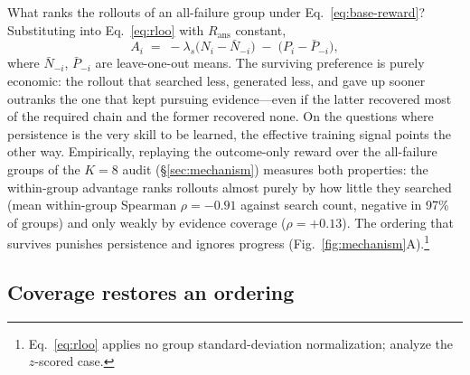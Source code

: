 What ranks the rollouts of an all-failure group under
Eq.~\ref{eq:base-reward}? Substituting into Eq.~\ref{eq:rloo} with
$R_{\mathrm{ans}}$ constant,
\begin{equation}
A_i \;=\; -\lambda_{s}\bigl(N_i - \bar{N}_{-i}\bigr)
\;-\;\bigl(P_i - \bar{P}_{-i}\bigr),
\label{eq:cost-ordering}
\end{equation}
where $\bar{N}_{-i}$, $\bar{P}_{-i}$ are leave-one-out means. The
surviving preference is purely economic: the rollout that searched
less, generated less, and gave up sooner outranks the one that kept
pursuing evidence---even if the latter recovered most of the required
chain and the former recovered none. On the questions where persistence
is the very skill to be learned, the effective training signal points
the other way. Empirically, replaying the outcome-only reward over the
all-failure groups of the $K{=}8$ audit (\S\ref{sec:mechanism})
measures both properties: the within-group advantage ranks rollouts
almost purely by how little they searched (mean within-group Spearman
$\rho = -0.91$ against search count, negative in 97\% of groups) and
only weakly by evidence coverage ($\rho = +0.13$).
The ordering that survives punishes persistence and ignores progress
(Fig.~\ref{fig:mechanism}A).\footnote{Eq.~\ref{eq:rloo} applies no
group standard-deviation normalization; \citet{wang2026darkroom}
analyze the $z$-scored case.}

\subsection{Coverage restores an ordering}
\label{sec:starve-fix}

